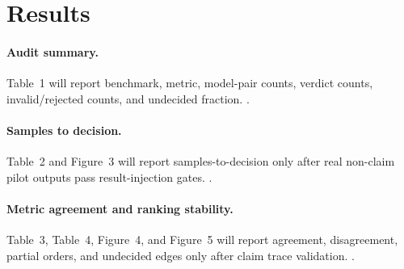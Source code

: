 \section{Results}

\paragraph{Audit summary.}
Table~1 will report benchmark, metric, model-pair counts, verdict counts, invalid/rejected counts, and undecided fraction. \texttt{}.

\paragraph{Samples to decision.}
Table~2 and Figure~3 will report samples-to-decision only after real non-claim pilot outputs pass result-injection gates. \texttt{}.

\paragraph{Metric agreement and ranking stability.}
Table~3, Table~4, Figure~4, and Figure~5 will report agreement, disagreement, partial orders, and undecided edges only after claim trace validation. \texttt{}.
